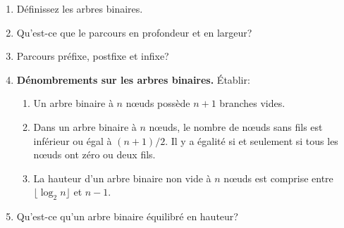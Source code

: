   \begin{enumerate}

    \item Définissez les arbres binaires.

    \item Qu'est-ce que le parcours en profondeur et en largeur?

    \item Parcours préfixe, postfixe et infixe?

    \item \textbf{Dénombrements sur les arbres binaires.} Établir:
      \begin{enumerate}

      \item Un arbre binaire à \(n\) n{\oe}uds possède \(n+1\) branches
        vides.

      \item Dans un arbre binaire à \(n\) n{\oe}uds, le nombre de
        n{\oe}uds sans fils est inférieur ou égal à \((n+1)/2\). Il y
        a égalité si et seulement si tous les n{\oe}uds ont zéro ou
        deux fils.

      \item La hauteur d'un arbre binaire non vide à \(n\) n{\oe}uds
        est comprise entre \(\lfloor\log_2{n}\rfloor\) et \(n-1\).

      \end{enumerate}

    \item Qu'est-ce qu'un arbre binaire équilibré en hauteur?

  \end{enumerate}
